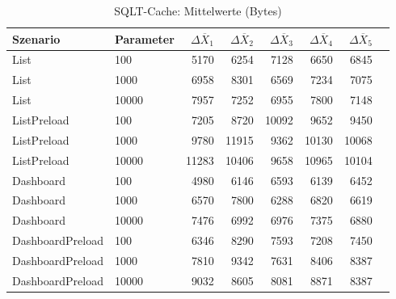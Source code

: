 
\begin{table}[ht]
\setlength{\extrarowheight}{-1pt}
\centering
\caption{SQLT-Cache: Mittelwerte (Bytes)}
\begin{tabular}{llrrrrrr}
\toprule
Szenario & Parameter & ${\Delta \overline{X}_1}$ & ${\Delta \overline{X}_2}$ & ${\Delta \overline{X}_3}$ & ${\Delta \overline{X}_4}$ & ${\Delta \overline{X}_5}$ \\
\midrule
	List & 100 & 5170 & 6254 & 7128 & 6650 & 6845 \\
	List & 1000 & 6958 & 8301 & 6569 & 7234 & 7075 \\
	List & 10000 & 7957 & 7252 & 6955 & 7800 & 7148 \\
	ListPreload & 100 & 7205 & 8720 & 10092 & 9652 & 9450 \\
	ListPreload & 1000 & 9780 & 11915 & 9362 & 10130 & 10068 \\
	ListPreload & 10000 & 11283 & 10406 & 9658 & 10965 & 10104 \\
	Dashboard & 100 & 4980 & 6146 & 6593 & 6139 & 6452 \\
	Dashboard & 1000 & 6570 & 7800 & 6288 & 6820 & 6619 \\
	Dashboard & 10000 & 7476 & 6992 & 6976 & 7375 & 6880 \\
	DashboardPreload & 100 & 6346 & 8290 & 7593 & 7208 & 7450 \\
	DashboardPreload & 1000 & 7810 & 9342 & 7631 & 8406 & 8387 \\
	DashboardPreload & 10000 & 9032 & 8605 & 8081 & 8871 & 8387 \\
\bottomrule
\end{tabular}
\label{tab:mittelwerte_sqlt-cache_bytes}
\end{table}
	